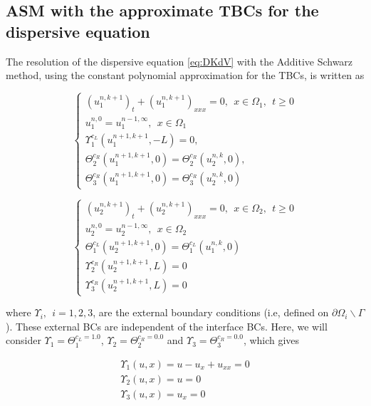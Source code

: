 \subsection{ASM with the approximate TBCs for the dispersive equation}

\indent The resolution of the dispersive equation \eqref{eq:DKdV} with the Additive Schwarz method, using the constant polynomial approximation for the TBCs, is written as

\begin{equation}
    \label{eq:problemDDM1}
    \begin{cases}
        (u_1^{n,k+1})_t + (u_1^{n,k+1})_{xxx} = 0 , \ \ x \in \Omega_1, \ \ t \geq 0\\
        u_1^{n,0} = u_1^{n-1,\infty} , \ \ x \in \Omega_1 \\
        \Upsilon_1^{c_L}(u_1^{n+1,k+1},-L) = 0, \\ 
        \Theta_2^{c_R}(u_1^{n+1,k+1},0) = \Theta_2^{c_R}(u_2^{n,k},0) , \\
        \Theta_3^{c_R}(u_1^{n+1,k+1},0) = \Theta_3^{c_R}(u_2^{n,k},0)
     \end{cases}
\end{equation}

\begin{equation}
    \label{eq:problemDDM2}
    \begin{cases}
        (u_2^{n,k+1})_t + (u_2^{n,k+1})_{xxx} = 0 , \ \ x \in \Omega_2, \ \ t \geq 0\\
        u_2^{n,0} = u_2^{n-1,\infty} , \ \ x \in \Omega_2 \\
        \Theta_1^{c_L}(u_2^{n+1,k+1},0) = \Theta_1^{c_L}(u_1^{n,k},0) \\
        \Upsilon_2^{c_R}(u_2^{n+1,k+1},L) = 0 \\
        \Upsilon_3^{c_R}(u_2^{n+1,k+1},L) = 0
     \end{cases}
\end{equation}

\noindent where $ \Upsilon_i, \ \ i=1,2,3$, are the external boundary conditions (i.e, defined on $\partial \Omega_i \backslash \Gamma$). These external BCs are independent of the interface BCs. Here, we will consider $\Upsilon_1 = \Theta_1^{c_L = 1.0}$, $\Upsilon_2 = \Theta_2^{c_R = 0.0}$ and $\Upsilon_3 = \Theta_3^{c_R = 0.0}$, which gives

\begin{equation}
	\label{eq:externalBCsDDM}
	\begin{gathered}
	\Upsilon_1(u,x) = u - u_x + u_{xx} = 0\\
	\Upsilon_2(u,x) = u = 0\\
	\Upsilon_3(u,x) = u_x = 0\\
	\end{gathered}
\end{equation}

